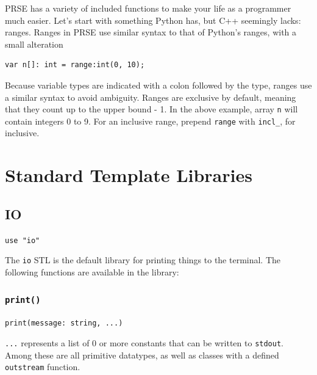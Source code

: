 \documentclass[letterpaper, 12pt]{article}
\begin{document}
PRSE has a variety of included functions to make your life as a programmer much easier. Let's start
with something Python has, but C++ seemingly lacks: ranges. Ranges in PRSE use similar syntax to
that of Python's ranges, with a small alteration

\begin{lstlisting}
var n[]: int = range:int(0, 10);
\end{lstlisting}

Because variable types are indicated with a colon followed by the type, ranges use a similar syntax
to avoid ambiguity. %
Ranges are exclusive by default, meaning that they count up to the upper bound - 1. In the above
example, array \texttt{n} will contain integers 0 to 9. For an inclusive range, prepend
\texttt{range} with \texttt{incl\_}, for inclusive.\linebreak



\section{Standard Template Libraries}

\subsection{IO}

\texttt{use "io"}\linebreak

The \texttt{io} STL is the default library for printing things to the terminal. The following
functions are available in the library:

\subsubsection{\texttt{print()}}

\texttt{print(message: string, ...)}\linebreak

\texttt{...} represents a list of 0 or more constants that can be written to \texttt{stdout}. Among
these are all primitive datatypes, as well as classes with a defined \texttt{outstream} %
function.
\end{document}
